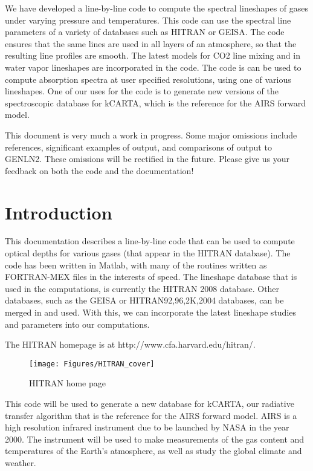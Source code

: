 \documentclass[11pt]{article}
\begin{document}
  We have developed a line-by-line code to compute the spectral lineshapes
  of gases under varying pressure and temperatures. This code can use the
  spectral line parameters of a variety of databases such as HITRAN or 
  GEISA. 
  The code ensures that the same lines are used in all layers of an
  atmosphere, so that the resulting line profiles are smooth. The latest
  models for CO2 line mixing and in water vapor lineshapes are incorporated
  in the code. The code is can be used to compute absorption spectra
  at user specified resolutions, using one of various lineshapes.
  One of our uses for the code is to generate new versions of the 
  spectroscopic database for kCARTA, which is the reference for the AIRS
  forward model.

This document is very much a work in progress.  Some major omissions
include references, significant examples of output, and comparisons of 
output to GENLN2.  These omissions will
be rectified in the future.  Please give us your feedback on both the
code and the documentation!  


\newpage
\section{Introduction}
This documentation describes a line-by-line code that can be used to 
compute optical depths for various gases (that appear in the HITRAN 
database). The code has been written in Matlab, with many of the routines 
written as FORTRAN-MEX files in the interests of speed. The lineshape 
database that is used in the computations, is currently the HITRAN 2008
database. Other databases, such as the GEISA or HITRAN92,96,2K,2004 
databases, can be merged in and used. With this, we can incorporate the 
latest lineshape studies and parameters into our computations. 

The HITRAN homepage is at http://www.cfa.harvard.edu/hitran/. 
\begin{figure}[h]
  \begin{center}\texttt{[image: Figures/HITRAN\_cover]}\end{center}
  \caption{HITRAN home page}
  \label{fig:hitran}
\end{figure}

This code will be used to generate a new database for kCARTA, our radiative
transfer algorithm that is the reference for the AIRS forward model. AIRS is
a high resolution infrared instrument due to be launched by NASA in the 
year 2000. The instrument will be used to make measurements of the gas 
content and temperatures of the Earth's atmosphere, as well as study the 
global climate and weather. 
\end{document}
